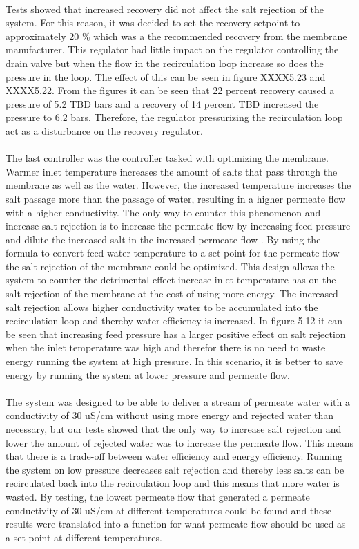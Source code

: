\\
Tests showed that increased recovery did not affect the salt rejection of the system. For this reason, it was decided to set the recovery setpoint to approximately 20 \% which was a the recommended recovery from the membrane manufacturer. This regulator had little impact on the regulator controlling the drain valve but when the flow in the recirculation loop increase so does the pressure in the loop. The effect of this can be seen in figure XXXX5.23 and XXXX5.22. From the figures it can be seen that 22 percent recovery caused a pressure of 5.2 TBD bars and a recovery of 14 percent TBD increased the pressure to 6.2 bars. Therefore, the regulator pressurizing the recirculation loop act as a disturbance on the recovery regulator.\\
\\
The last controller was the controller tasked with optimizing the membrane. Warmer inlet temperature increases the amount of salts that pass through the membrane as well as the water. However, the increased temperature increases the salt passage more than the passage of water, resulting in a higher permeate flow with a higher conductivity. The only way to counter this phenomenon and increase salt rejection is to increase the permeate flow by increasing feed pressure and dilute the increased salt in the increased permeate flow . By using the formula to convert feed water temperature to a set point for the permeate flow the salt rejection of the membrane could be optimized. This design allows the system to counter the detrimental effect increase inlet temperature has on the salt rejection of the membrane at the cost of using more energy. The increased salt rejection allows higher conductivity water to be accumulated into the recirculation loop and thereby water efficiency is increased. In figure 5.12 it can be seen that increasing feed pressure has a larger positive effect on salt rejection when the inlet temperature was high and therefor there is no need to waste energy running the system at high pressure. In this scenario, it is better to save energy by running the system at lower pressure and permeate flow. \\
\\
The system was designed to be able to deliver a stream of permeate water with a conductivity of 30 uS/cm without using more energy and rejected water than necessary, but our tests showed that the only way to increase salt rejection and lower the amount of rejected water was to increase the permeate flow. This means that there is a trade-off between water efficiency and energy efficiency. Running the system on low pressure decreases salt rejection and thereby less salts can be recirculated back into the recirculation loop and this means that more water is wasted. By testing, the lowest permeate flow that generated a permeate conductivity of 30 uS/cm at different temperatures could be found and these results were translated into a function for what permeate flow should be used as a set point at different temperatures. 

